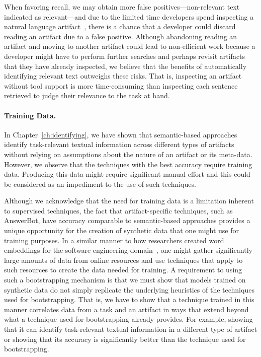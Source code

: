 When favoring recall,  we may obtain more false positives---non-relevant text indicated as relevant---and
due to the limited time developers spend inspecting a natural language artifact~\cite{Starke2009}, there is a chance that
 a developer could discard reading an artifact due to a false positive. 
 Although abandoning reading an artifact and moving to another artifact could lead to non-efficient work 
 because
a developer might have to perform further searches and perhaps revisit artifacts that they have already inspected,
we believe that the benefits of automatically identifying relevant text outweighs these risks. 
That is, inspecting an artifact without tool support is more time-consuming
than inspecting each sentence retrieved to judge their relevance to the task at hand. 




\paragraph{\textbf{Training Data.}}


In Chapter~\ref{ch:identifying}, we have shown that semantic-based approaches identify task-relevant textual information across
different types of artifacts without relying on
assumptions about the nature of an artifact or its meta-data.
However, we
observe that the techniques with the best accuracy require training data. Producing this
 data might require significant manual effort and this could be considered as an impediment to the use of such  techniques. 



Although we acknowledge that the need for training data is a limitation inherent to supervised techniques,
the fact that artifact-specific techniques, such as AnswerBot, have accuracy comparable to semantic-based approaches
 provides
a unique opportunity for the creation of synthetic data that one might use for training purposes.
In a similar manner to how researchers created word embeddings for the software engineering domain~\cite{Efstathiou2018}, one might gather significantly large amounts of data from online resources
and use techniques that apply to such resources to create the data needed for training.
A requirement to using such a bootstrapping mechanism is that we must show that models trained on synthetic data do not simply replicate the underlying heuristics of the techniques used for bootstrapping. That is, we have to show that a technique trained
in this manner correlates data from a task and an artifact in ways that
extend beyond what a technique used for bootstrapping already provides. For example, showing that
it can identify task-relevant textual information in a different type of artifact or showing
that its accuracy is significantly better than the technique used for bootstrapping.



